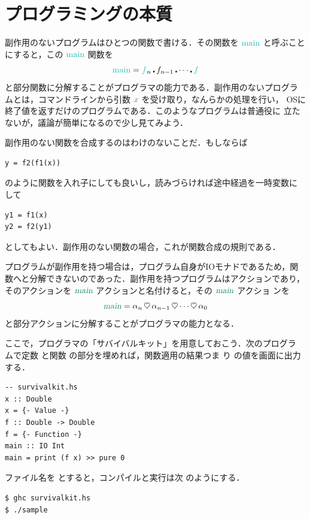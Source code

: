 \documentclass[a5paper,twoside,fleqn,draft]{jsbook}
\begin{document}
\section{プログラミングの本質}

副作用のないプログラムはひとつの関数で書ける．その関数を $\mMainFunc$
と呼ぶことにすると，この $\mMainFunc$ 関数を
\begin{equation}
\mMainFunc=\hFunc{f}_n\hCompose f_{n-1}\hCompose\dotsb\hCompose \hFunc{f}
\end{equation}
と部分関数に分解することがプログラマの能力である．副作用のないプログラ
ムとは，コマンドラインから引数 $\hVar{x}$ を受け取り，なんらかの処理を行い，
OSに終了値を返すだけのプログラムである．このようなプログラムは普通役に
立たないが，議論が簡単になるので少し見てみよう．

副作用のない関数を合成するのはわけのないことだ．もし\python ならば
\begin{pythoncode}
\begin{verbatim}
y = f2(f1(x))
\end{verbatim}
\end{pythoncode}
のように関数を入れ子にしても良いし，読みづらければ途中経過を一時変数に
して
\begin{pythoncode}
\begin{verbatim}
y1 = f1(x)
y2 = f2(y1)
\end{verbatim}
\end{pythoncode}
としてもよい．副作用のない関数の場合，これが関数合成の規則である．

プログラムが副作用を持つ場合は，プログラム自身がIOモナドであるため，関
数へと分解できないのであった．副作用を持つプログラムはアクションであり，
そのアクションを $\mMain$ アクションと名付けると，その $\mMain$ アクショ
ンを
\begin{equation}
\mMain=\alpha_n\mBind\alpha_{n-1}\mBind\dotsb\mBind\alpha_0
\end{equation}
と部分アクションに分解することがプログラマの能力となる．


\separator

ここで，プログラマの「サバイバルキット」を用意しておこう．次のプログラ
ムで定数  と関数  の部分を埋めれば，関数適用の結果つま
り  の値を画面に出力する．
\begin{haskellcode}
\begin{verbatim}
-- survivalkit.hs
x :: Double
x = {- Value -}
f :: Double -> Double
f = {- Function -}
main :: IO Int
main = print (f x) >> pure 0
\end{verbatim}
\end{haskellcode}
ファイル名を  とすると，コンパイルと実行は次
のようにする．
\begin{verbatim}
$ ghc survivalkit.hs
$ ./sample
\end{verbatim}%
\end{document}
